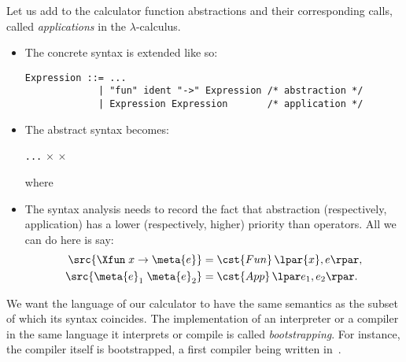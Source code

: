 Let us add to the calculator function abstractions and their
corresponding calls, called \emph{applications} in the
\(\lambda\)-calculus.
\begin{itemize}

  \item The concrete syntax is extended like so:
\begin{verbatim}
Expression ::= ...
             | "fun" ident "->" Expression /* abstraction */
             | Expression Expression       /* application */
\end{verbatim}

  \item The abstract syntax becomes:

  \noindent \Xtype {} \equal \texttt{...} \vbar {}
  \Xof {} \(\times\)  \vbar {}
  \Xof {} \(\times\) 

  \noindent where

  \item The syntax analysis needs to record the fact that abstraction
    (respectively, application) has a lower (respectively, higher)
    priority than operators. All we can do here is say:
\begin{align*}
\src{\Xfun \; x \rightarrow \meta{e}}
  &= \cst{Fun} \, \lpar{x}, e\rpar,\\
\src{\meta{e}_1 \; \meta{e}_2}
  &= \cst{App} \, \lpar e_1, e_2\rpar.
\end{align*}

\end{itemize}
We want the language of our calculator to have the same semantics as
the subset of \OCaml which its syntax coincides. The implementation of
an interpreter or a compiler in the same language it interprets or
compile is called \emph{bootstrapping}. For instance, the \OCaml
compiler itself is bootstrapped, a first compiler being written
in~\Clang.

